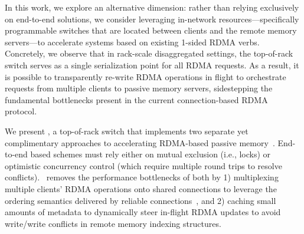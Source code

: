 
In this work, we explore an alternative dimension: rather than relying
exclusively on end-to-end solutions, we consider leveraging in-network
resources---specifically programmable switches that are located between
clients and the remote memory servers---to accelerate systems based on
existing 1-sided RDMA verbs.  Concretely, we observe that in
rack-scale disaggregated settings, the top-of-rack switch serves as a
single serialization point for all RDMA requests.  As a result, it is
possible to transparently re-write RDMA operations in flight to
orchestrate requests from multiple clients to passive memory servers,
sidestepping the fundamental bottlenecks present in the current
connection-based RDMA protocol.



We present \sword, a top-of-rack switch that implements two separate
yet complimentary approaches to accelerating RDMA-based passive memory~\cite{Grant2021InContRes}.  End-to-end based schemes must rely either on mutual
exclusion (i.e., locks) or optimistic concurrency control (which
require multiple round trips to resolve conflicts).  \sword\ removes
the performance bottlenecks of both by 1) multiplexing multiple
clients' RDMA operations onto shared connections to leverage the
ordering semantics delivered by reliable connections~\cite{flock}, and
2) caching small amounts of metadata to dynamically steer in-flight
RDMA updates to avoid write/write conflicts in remote memory indexing structures.

